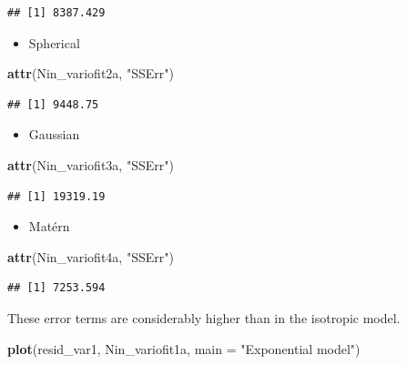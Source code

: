 \documentclass[
]{book}
\newenvironment{Shaded}{\begin{snugshade}}{\end{snugshade}}
\newcommand{\AttributeTok}[1]{\textcolor[rgb]{0.13,0.29,0.53}{#1}}
\newcommand{\FunctionTok}[1]{\textcolor[rgb]{0.13,0.29,0.53}{\textbf{#1}}}
\newcommand{\NormalTok}[1]{#1}
\newcommand{\StringTok}[1]{\textcolor[rgb]{0.31,0.60,0.02}{#1}}
\providecommand{\tightlist}{%
  \setlength{\itemsep}{0pt}\setlength{\parskip}{0pt}}
\begin{document}
\begin{verbatim}
## [1] 8387.429
\end{verbatim}

\begin{itemize}
\tightlist
\item
  Spherical
\end{itemize}

\begin{Shaded}
\begin{Highlighting}[]
\FunctionTok{attr}\NormalTok{(Nin\_variofit2a, }\StringTok{"SSErr"}\NormalTok{)}
\end{Highlighting}
\end{Shaded}

\begin{verbatim}
## [1] 9448.75
\end{verbatim}

\begin{itemize}
\tightlist
\item
  Gaussian
\end{itemize}

\begin{Shaded}
\begin{Highlighting}[]
\FunctionTok{attr}\NormalTok{(Nin\_variofit3a, }\StringTok{"SSErr"}\NormalTok{)}
\end{Highlighting}
\end{Shaded}

\begin{verbatim}
## [1] 19319.19
\end{verbatim}

\begin{itemize}
\tightlist
\item
  Matérn
\end{itemize}

\begin{Shaded}
\begin{Highlighting}[]
\FunctionTok{attr}\NormalTok{(Nin\_variofit4a, }\StringTok{"SSErr"}\NormalTok{)}
\end{Highlighting}
\end{Shaded}

\begin{verbatim}
## [1] 7253.594
\end{verbatim}

These error terms are considerably higher than in the isotropic model.

\begin{Shaded}
\begin{Highlighting}[]
\FunctionTok{plot}\NormalTok{(resid\_var1, Nin\_variofit1a, }\AttributeTok{main =} \StringTok{"Exponential model"}\NormalTok{)}
\end{Highlighting}
\end{Shaded}
\end{document}
